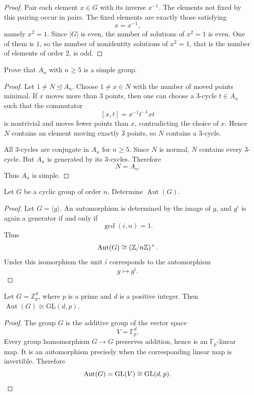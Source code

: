 \begin{proof}
Pair each element \(x\in G\) with its inverse \(x^{-1}\). The elements not fixed
by this pairing occur in pairs. The fixed elements are exactly those satisfying
\[
    x=x^{-1},
\]
namely \(x^2=1\). Since \(|G|\) is even, the number of solutions of \(x^2=1\)
is even. One of them is \(1\), so the number of nonidentity solutions of
\(x^2=1\), that is the number of elements of order \(2\), is odd.
\end{proof}

\begin{exercise}
Prove that \(A_n\) with \(n \geq 5\) is a simple group.
\end{exercise}

\begin{proof}
Let \(1\neq N\trianglelefteq A_n\). Choose \(1\neq x\in N\) with the number of
moved points minimal. If \(x\) moves more than \(3\) points, then one can choose
a \(3\)-cycle \(t\in A_n\) such that the commutator
\[
    [x,t]=x^{-1}t^{-1}xt
\]
is nontrivial and moves fewer points than \(x\), contradicting the choice of
\(x\). Hence \(N\) contains an element moving exactly \(3\) points, so \(N\)
contains a \(3\)-cycle.

All \(3\)-cycles are conjugate in \(A_n\) for \(n\geq 5\). Since \(N\) is normal,
\(N\) contains every \(3\)-cycle. But \(A_n\) is generated by its \(3\)-cycles.
Therefore
\[
    N=A_n.
\]
Thus \(A_n\) is simple.
\end{proof}

\begin{exercise}
Let \(G\) be a cyclic group of order \(n\). Determine \(\operatorname{Aut}(G)\).
\end{exercise}

\begin{proof}
Let \(G=\langle g\rangle\). An automorphism is determined by the image of \(g\),
and \(g^i\) is again a generator if and only if
\[
    \gcd(i,n)=1.
\]
Thus
\[
    \operatorname{Aut}(G)\cong (\mathbb Z/n\mathbb Z)^\times.
\]
Under this isomorphism the unit \(\overline{i}\) corresponds to the automorphism
\[
    g\mapsto g^i.
\]
\end{proof}

\begin{exercise}
Let \(G = \mathbb{Z}_p^d\), where \(p\) is a prime and \(d\) is a positive
integer. Then \(\operatorname{Aut}(G) \cong \mathrm{GL}(d,p)\).
\end{exercise}

\begin{proof}
The group \(G\) is the additive group of the vector space
\[
    V=\mathbb F_p^d.
\]
Every group homomorphism \(G\to G\) preserves addition, hence is an
\(\mathbb F_p\)-linear map. It is an automorphism precisely when the
corresponding linear map is invertible. Therefore
\[
    \operatorname{Aut}(G)=\operatorname{GL}(V)\cong \mathrm{GL}(d,p).
\]
\end{proof}


